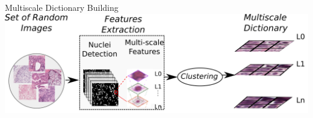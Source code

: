 \documentclass[usenames,dvipsnames]{beamer}
\begin{document}
\begin{frame}{Multiscale Dictionary Building}
\centering\includegraphics[width=\textwidth]{nuevoM/dictionaryBuilding.png}
    
\end{frame}


%
\end{document}
